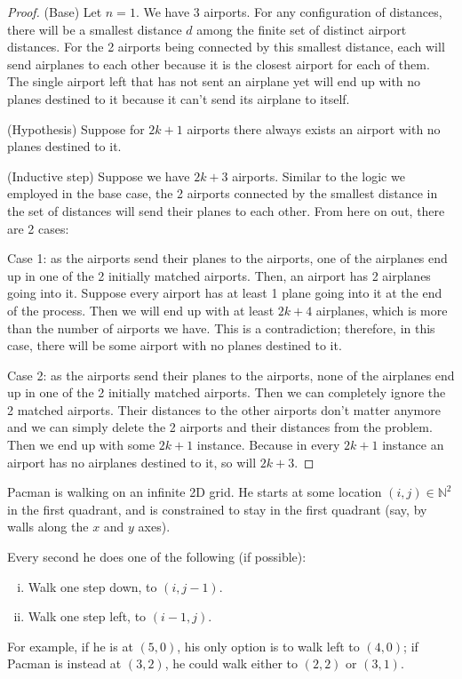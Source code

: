 \documentclass[11pt]{article}
\begin{document}
\begin{solution}
\begin{proof}
(Base) Let $n=1$. We have 3 airports. For any configuration of distances,
there will be a smallest distance $d$ among the finite set of distinct airport distances.
For the 2 airports being connected by this smallest distance, each will send airplanes to each other because it is the closest airport for each of them.
The single airport left that has not sent an airplane yet will end up with no planes destined to it because it can't send its airplane to itself.

(Hypothesis) Suppose for $2k+1$ airports there always exists an airport with no planes destined to it.

(Inductive step) Suppose we have $2k+3$ airports. Similar to the logic we employed in the base case,
the 2 airports connected by the smallest distance in the set of distances will send their planes to each other.
From here on out, there are 2 cases:

Case 1: as the airports send their planes to the airports, one of the airplanes
end up in one of the 2 initially matched airports. Then, an airport has 2 airplanes going into it.
Suppose every airport has at least 1 plane going into it at the end of the process.
Then we will end up with at least $2k+4$ airplanes, which is more than the number of airports we have.
This is a contradiction; therefore, in this case, there will be some airport with no planes destined to it.

Case 2: as the airports send their planes to the airports, none of the airplanes 
end up in one of the 2 initially matched airports. Then we can completely ignore the 2 matched airports.
Their distances to the other airports don't matter anymore and we can simply delete the 2 airports and their distances from the problem.
Then we end up with some $2k+1$ instance. Because in every $2k+1$ instance
an airport has no airplanes destined to it, so will $2k+3$.
\end{proof}
\end{solution} \newpage
{}

Pacman is walking on an infinite 2D grid.
He starts at some location $(i, j) \in \mathbb{N}^2$ in the first quadrant,
and is constrained to stay in the first quadrant (say, by walls along the $x$ and $y$ axes).

Every second he does one of the following (if possible):
\begin{enumerate}[(i)]
	\item Walk one step down, to $(i, j-1)$.
	\item Walk one step left, to $(i-1, j)$.
\end{enumerate}
For example, if he is at $(5, 0)$, his only option is to walk left to $(4, 0)$; if Pacman is instead at $(3, 2)$, he could walk either to $(2, 2)$ or $(3, 1)$.
\end{document}

